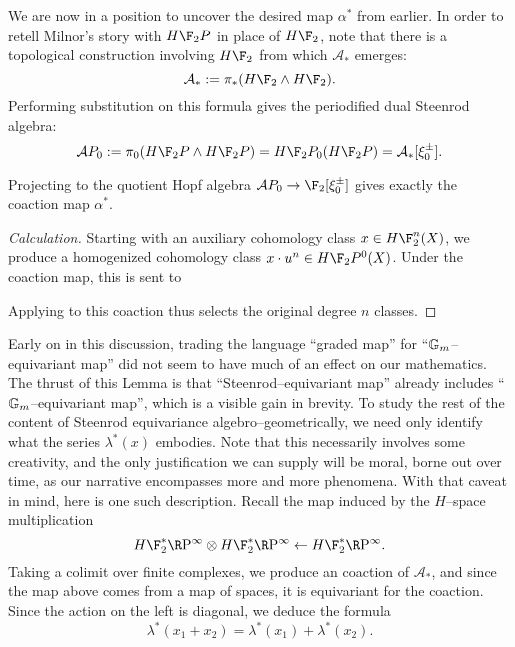 We are now in a position to uncover the desired map $\alpha^*$ from earlier.  In order to retell Milnor's story with $H\F_2P$ in place of $H\F_2$, note that there is a topological construction involving $H\F_2$ from which $\mathcal A_*$ emerges: \[\mathcal A_* := \pi_*(H\F_2 \sm H\F_2).\]  Performing substitution on this formula gives the periodified dual Steenrod algebra: \[\mathcal AP_0 := \pi_0 (H\F_2 P \sm H\F_2 P) = H\F_2P_0(H\F_2 P) = \mathcal A_*[\xi_0^\pm].\]

\begin{lemma}
Projecting to the quotient Hopf algebra $\mathcal AP_0 \to \F_2[\xi_0^\pm]$ gives exactly the coaction map $\alpha^*$.
\end{lemma}
\begin{proof}[Calculation]
Starting with an auxiliary cohomology class $x \in H\F_2^n(X)$, we produce a homogenized cohomology class $x \cdot u^n \in H\F_2P^0(X)$.  Under the coaction map, this is sent to
\begin{center}
\end{center}
Applying  to this coaction thus selects the original degree $n$ classes.
\end{proof}

Early on in this discussion, trading the language ``graded map'' for ``$\mathbb G_m$--equivariant map'' did not seem to have much of an effect on our mathematics.  The thrust of this Lemma is that ``Steenrod--equivariant map'' already includes ``$\mathbb G_m$--equivariant map'', which is a visible gain in brevity.  To study the rest of the content of Steenrod equivariance algebro--geometrically, we need only identify what the series $\lambda^*(x)$ embodies.  Note that this necessarily involves some creativity, and the only justification we can supply will be moral, borne out over time, as our narrative encompasses more and more phenomena.  With that caveat in mind, here is one such description.  Recall the map induced by the $H$--space multiplication \[H\F_2^* \RP^\infty \otimes H\F_2^* \RP^\infty \leftarrow H\F_2^* \RP^\infty.\]  Taking a colimit over finite complexes, we produce an coaction of $\mathcal A_*$, and since the map above comes from a map of spaces, it is equivariant for the coaction.  Since the action on the left is diagonal, we deduce the formula \[\lambda^*(x_1 + x_2) = \lambda^*(x_1) + \lambda^*(x_2).\]

